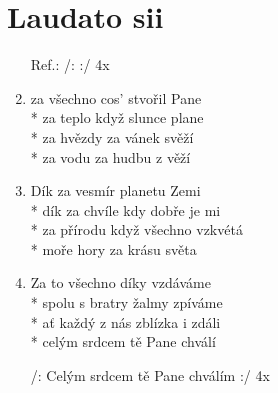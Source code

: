 \section{Laudato sii}
\begin{enumerate}
\item[Ref.:] /:  :/ 4x 
\item {} za všechno cos' stvořil Pane \\*
 za teplo když slunce plane \\*
 za hvězdy za vánek svěží \\*
 za vodu za hudbu z věží 
\item Dík za vesmír planetu Zemi \\*
dík za chvíle kdy dobře je mi \\*
za přírodu když všechno vzkvétá \\*
moře hory za krásu světa 
\item Za to všechno díky vzdáváme \\*
spolu s bratry žalmy zpíváme \\*
ať každý z nás zblízka i zdáli \\*
celým srdcem tě Pane chválí
\item[] /: Celým srdcem tě Pane chválím :/ 4x
\end{enumerate}
